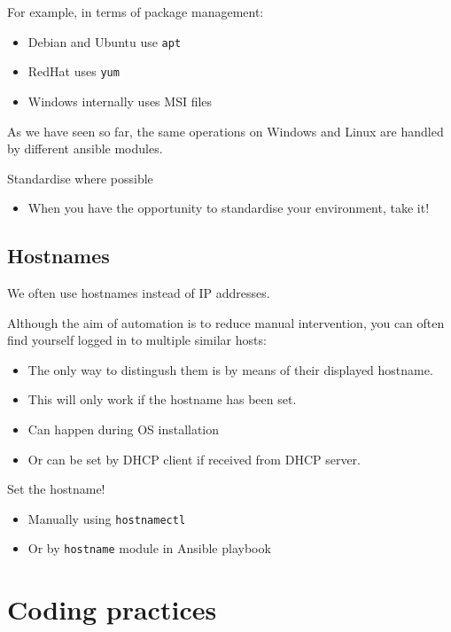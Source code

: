 \documentclass[slides]{pgnotes}
\begin{document}
For example, in terms of package management:
\begin{itemize}
\item Debian and Ubuntu use \texttt{apt}
\item RedHat uses \texttt{yum}
\item Windows internally uses MSI files
\end{itemize}

As we have seen so far, the same operations on Windows and Linux are handled by different ansible modules.

\begin{greenbox}{Standardise where possible}
  \begin{itemize}
  \item When you have the opportunity to standardise your environment, take it!
  \end{itemize}
\end{greenbox}

\subsection{Hostnames}

We often use hostnames instead of IP addresses. 

Although the aim of automation is to reduce manual intervention, you can often find yourself logged in to multiple similar hosts:
\begin{itemize}
\item The only way to distingush them is by means of their displayed hostname.
\item This will only work if the hostname has been set.
\item Can happen during OS installation
\item Or can be set by DHCP client if received from DHCP server.
\end{itemize}

\begin{greenbox}{Set the hostname!}
  \begin{itemize}
  \item Manually using \texttt{hostnamectl}
  \item Or by \texttt{hostname} module in Ansible playbook
  \end{itemize}
\end{greenbox}



\section{Coding practices}
\end{document}

